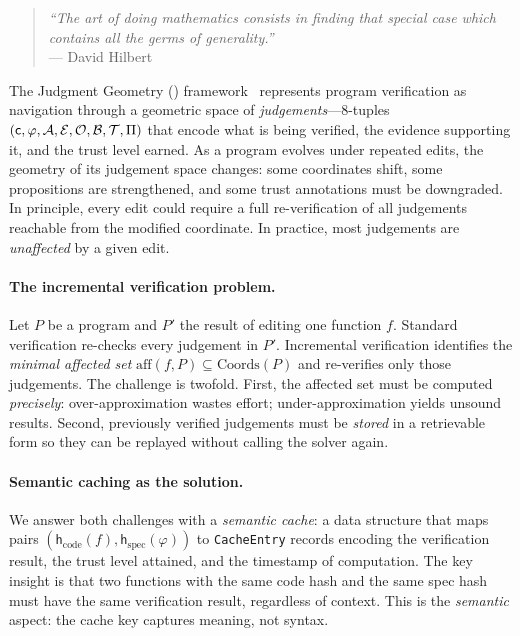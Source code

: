 \documentclass[11pt]{article}
\newcommand{\CodeHash}{\mathsf{h}_{\mathrm{code}}} %
\newcommand{\SpecHash}{\mathsf{h}_{\mathrm{spec}}} %
\newcommand{\affected}{\mathrm{aff}}               %
\begin{document}
\begin{quote}
\emph{``The art of doing mathematics consists in finding that special
case which contains all the germs of generality.''}\\
\mbox{}\hfill --- David Hilbert
\end{quote}

\medskip\noindent
The Judgment Geometry (\JuGeo{}) framework~\cite{jg01} represents
program verification as navigation through a geometric space of
\emph{judgements}---8-tuples $(\mathsf{c}, \varphi, \mathcal{A}, \mathcal{E}, \mathcal{O},
\mathcal{B}, \mathcal{T}, \Pi)$ that encode what is being verified, the
evidence supporting it, and the trust level earned.  As a program
evolves under repeated edits, the geometry of its judgement space
changes: some coordinates shift, some propositions are strengthened,
and some trust annotations must be downgraded.  In principle, every
edit could require a full re-verification of all judgements reachable
from the modified coordinate.  In practice, most judgements are
\emph{unaffected} by a given edit.

\paragraph{The incremental verification problem.}
Let $P$ be a program and $P'$ the result of editing one function $f$.
Standard verification re-checks every judgement in $P'$.  Incremental
verification identifies the \emph{minimal affected set}
$\affected(f, P) \subseteq \mathrm{Coords}(P)$ and re-verifies only
those judgements.  The challenge is twofold.  First, the affected set
must be computed \emph{precisely}: over-approximation wastes effort;
under-approximation yields unsound results.  Second, previously
verified judgements must be \emph{stored} in a retrievable form so
they can be replayed without calling the solver again.

\paragraph{Semantic caching as the solution.}
We answer both challenges with a \emph{semantic cache}: a data
structure that maps pairs $(\CodeHash(f), \SpecHash(\varphi))$ to
\texttt{CacheEntry} records encoding the verification result, the
trust level attained, and the timestamp of computation.  The key
insight is that two functions with the same code hash and the same
spec hash must have the same verification result, regardless of
context.  This is the \emph{semantic} aspect: the cache key captures
meaning, not syntax.
\end{document}
